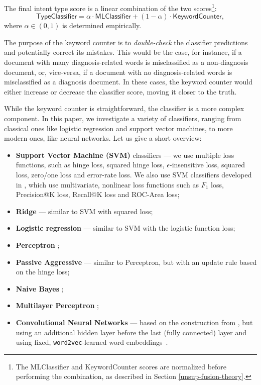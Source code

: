 The final intent type score is a linear combination of the two scores\footnote{The \textsf{MLClassifier} and \textsf{KeywordCounter}
scores are normalized before performing the combination, as described in Section \ref{unsup-fusion-theory}.}:
\begin{equation}\label{clf-combine-formula}
 \textsf{TypeClassifier} = \alpha\cdot\textsf{MLClassifier} + (1-\alpha)\cdot\textsf{KeywordCounter},
\end{equation}
where $\alpha\in (0,1)$ is determined empirically.

The purpose of the keyword counter is to \emph{double-check} the classifier predictions and potentially correct its mistakes.
This would be the case, for instance,
if a document with many diagnosis-related words is misclassified as a non-diagnosis document,
or, vice-versa, if a document with no diagnosis-related words is misclassified as a diagnosis document.
In these cases, the keyword counter would either increase or decrease the classifier score, moving it closer to the truth.


While the keyword counter is straightforward, the classifier is a more complex component. In this paper, we investigate
a variety of classifiers, ranging from classical ones like logistic regression and support vector machines, to more modern
ones, like neural networks. Let us give a short overview:

\begin{itemize}
 \item \textbf{Support Vector Machine (SVM)} classifiers ---
we use multiple loss functions, such as hinge loss,
squared hinge loss, $\epsilon$-insensitive loss, squared loss, zero/one loss and error-rate loss.
We also use SVM classifiers developed in \cite{svmperf3, svmperf1, svmperf2}, which use multivariate,
nonlinear loss functions such as $F_1$ loss, Precision@K loss, Recall@K loss and ROC-Area loss;
\item \textbf{Ridge} \cite{scikit} --- similar to SVM with squared loss;
\item \textbf{Logistic regression} \cite{scikit} --- similar to SVM with the logistic function loss;
\item \textbf{Perceptron} \cite{scikit};
\item \textbf{Passive Aggressive} \cite{passiveAggr} --- similar to Perceptron, but with an update rule
  based on the hinge loss;
\item \textbf{Naive Bayes} \cite{ir-intro};
\item \textbf{Multilayer Perceptron} \cite{scikit};
\item \textbf{Convolutional Neural Networks} --- based on the construction from \cite{cnn}, but using an additional
hidden layer before the last (fully connected) layer and using fixed, \texttt{word2vec}-learned word embeddings~\cite{w2v}.
\end{itemize}

